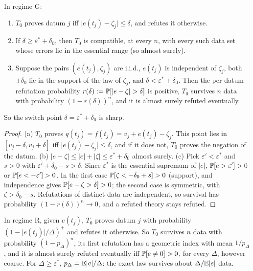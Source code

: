 \begin{proposition}\label{prop:laws:tolerance}
In regime G:
\begin{enumerate}[label=(\alph*),itemsep=1pt,topsep=2pt]
\item $T_0$ proves datum $j$ iff $\lvert e(t_j)-\zeta_j\rvert\le\delta$, and refutes it otherwise.
\item If $\delta\ge\varepsilon^*+\delta_0$, then $T_0$ is compatible, at every $n$, with every such data set whose errors lie in the essential range (so almost surely).
\item Suppose the pairs $(e(t_j),\zeta_j)$ are i.i.d., $e(t_j)$ is independent of $\zeta_j$, both $\pm\delta_0$ lie in the support of the law of $\zeta_j$, and $\delta<\varepsilon^*+\delta_0$. Then the per-datum refutation probability $r(\delta):=\mathbb{P}[\lvert e-\zeta\rvert>\delta]$ is positive, $T_0$ survives $n$ data with probability $(1-r(\delta))^n$, and it is almost surely refuted eventually.
\end{enumerate}
So the switch point $\delta=\varepsilon^*+\delta_0$ is sharp.
\end{proposition}

\begin{proof}
(a) $T_0$ proves $q(t_j)=f(t_j)=v_j+e(t_j)-\zeta_j$. This point lies in $[v_j-\delta,v_j+\delta]$ iff $\lvert e(t_j)-\zeta_j\rvert\le\delta$, and if it does not, $T_0$ proves the negation of the datum. (b) $\lvert e-\zeta\rvert\le\lvert e\rvert+\lvert\zeta\rvert\le\varepsilon^*+\delta_0$ almost surely. (c) Pick $\varepsilon'<\varepsilon^*$ and $s>0$ with $\varepsilon'+\delta_0-s>\delta$. Since $\varepsilon^*$ is the essential supremum of $\lvert e\rvert$, $\mathbb{P}[e>\varepsilon']>0$ or $\mathbb{P}[e<-\varepsilon']>0$. In the first case $\mathbb{P}[\zeta<-\delta_0+s]>0$ (support), and independence gives $\mathbb{P}[e-\zeta>\delta]>0$; the second case is symmetric, with $\zeta>\delta_0-s$. Refutations of distinct data are independent, so survival has probability $(1-r(\delta))^n\to0$, and a refuted theory stays refuted.
\end{proof}

\begin{proposition}\label{prop:laws:rounding}
In regime R, given $e(t_j)$, $T_0$ proves datum $j$ with probability $(1-\lvert e(t_j)\rvert/\Delta)^+$ and refutes it otherwise. So $T_0$ survives $n$ data with probability $(1-p_\Delta)^n$, its first refutation has a geometric index with mean $1/p_\Delta$, and it is almost surely refuted eventually iff $\mathbb{P}[e\ne0]>0$, for every $\Delta$, however coarse. For $\Delta\ge\varepsilon^*$, $p_\Delta=\mathbb{E}\lvert e\rvert/\Delta$: the exact law survives about $\Delta/\mathbb{E}\lvert e\rvert$ data.
\end{proposition}


